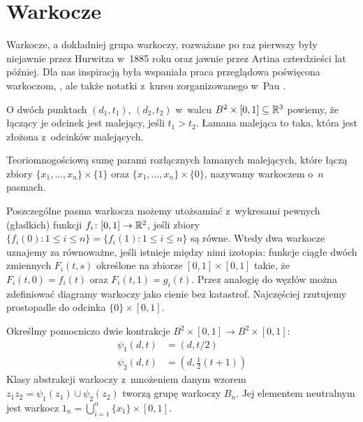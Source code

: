 
\section{Warkocze}
\label{sec:braid}
Warkocze, a dokładniej grupa warkoczy, rozważane po raz pierwszy były niejawnie przez Hurwitza w~1885 roku oraz jawnie przez Artina czterdzieści lat później.
Dla nas inspiracją była wspaniała praca przeglądowa poświęcona warkoczom, \cite{birman05}, ale także notatki z~kursu zorganizowanego w~Pau \cite{gonzalez11}.

O dwóch punktach $(d_1, t_1)$, $(d_2, t_2)$ w~walcu $B^2 \times [0, 1] \subseteq \mathbb R^3$ powiemy, że łączący je odcinek jest malejący, jeśli $t_1 > t_2$.
Łamana malejąca to taka, która jest złożona z~odcinków malejących.

\begin{definition}[warkocz]
%
Teoriomnogościową sumę parami rozłącznych łamanych malejących, które łączą zbiory $\{x_1, \ldots, x_n\} \times \{1\}$ oraz $\{x_1, \ldots, x_n\} \times \{0\}$, nazywamy warkoczem o~$n$ pasmach.
\end{definition}

Poszczególne pasma warkocza możemy utożsamiać z~wykresami pewnych (gładkich) funkcji $f_i \colon [0, 1] \to \mathbb R^2$, jeśli zbiory $\{f_i(0) : 1 \le i \le n\} = \{f_i(1) : 1 \le i \le n\}$ są równe.
Wtedy dwa warkocze uznajemy za równoważne, jeśli istnieje między nimi izotopia: funkcje ciągłe dwóch zmiennych $F_i(t, s)$ określone na zbiorze $[0,1] \times [0,1]$ takie, że $F_i(t,0)= f_i(t)$ oraz $F_i(t, 1) = g_i(t)$.
Przez analogię do węzłów można zdefiniować diagramy warkoczy jako cienie bez katastrof.
Najczęściej rzutujemy prostopadle do odcinka $\{0\} \times [0, 1]$.

\begin{definition}
%
    Określmy pomocniczo dwie kontrakcje $B^2 \times [0,1] \to B^2 \times [0,1]$:
    \begin{align*}
        \psi_1(d, t)&  = (d, t/2) \\
        \psi_2(d, t)&  = (d, \frac12 (t+1))
    \end{align*}
    Klasy abstrakcji warkoczy z~mnożeniem danym wzorem $z_1z_2 = \psi_1(z_1) \cup \psi_2(z_2)$ tworzą grupę warkoczy $B_n$.
    Jej elementem neutralnym jest warkocz $1_n = \bigcup_{i = 1}^n \{x_1\} \times [0,1]$.
\end{definition}

